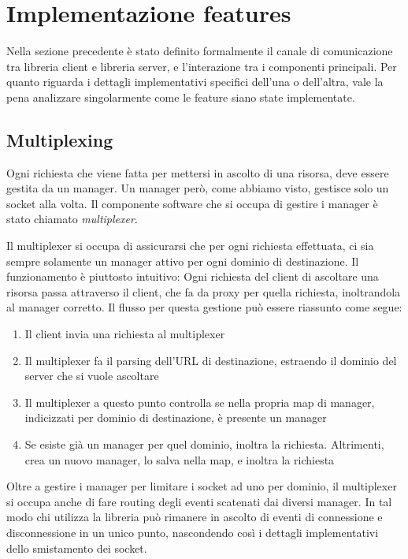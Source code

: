 \documentclass[12pt,a4paper,openright,twoside]{report}
\begin{document}
\section{Implementazione features}

Nella sezione precedente è stato definito formalmente il canale di comunicazione tra libreria client e libreria server, e l'interazione tra i componenti principali. Per quanto riguarda i dettagli implementativi specifici dell'una o dell'altra, vale la pena analizzare singolarmente come le feature siano state implementate.

\subsection{Multiplexing}

Ogni richiesta che viene fatta per mettersi in ascolto di una risorsa, deve essere gestita da un manager. Un manager però, come abbiamo visto, gestisce solo un socket alla volta. Il componente software che si occupa di gestire i manager è stato chiamato \textit{multiplexer}.

\bigskip

Il multiplexer si occupa di assicurarsi che per ogni richiesta effettuata, ci sia sempre solamente un manager attivo per ogni dominio di destinazione. Il funzionamento è piuttosto intuitivo: Ogni richiesta del client di ascoltare una risorsa passa attraverso il client, che fa da proxy per quella richiesta, inoltrandola al manager corretto. Il flusso per questa gestione può essere riassunto come segue:
\begin{enumerate}
\item Il client invia una richiesta al multiplexer
\item Il multiplexer fa il parsing dell'URL di destinazione, estraendo il dominio del server che si vuole ascoltare
\item Il multiplexer a questo punto controlla se nella propria map di manager, indicizzati per dominio di destinazione, è presente un manager
\item Se esiste già un manager per quel dominio, inoltra la richiesta. Altrimenti, crea un nuovo manager, lo salva nella map, e inoltra la richiesta
\end{enumerate}

Oltre a gestire i manager per limitare i socket ad uno per dominio, il multiplexer si occupa anche di fare routing degli eventi scatenati dai diversi manager. In tal modo chi utilizza la libreria può rimanere in ascolto di eventi di connessione e disconnessione in un unico punto, nascondendo così i dettagli implementativi dello smistamento dei socket.
\end{document}
